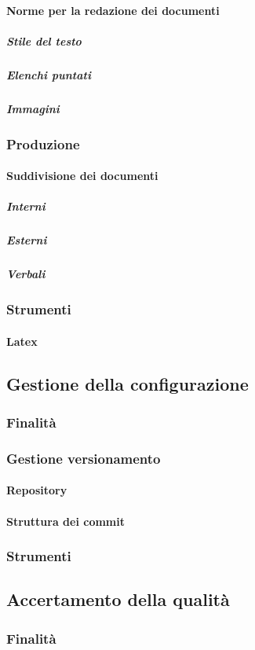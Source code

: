 \documentclass[../norme-di-progetto.tex]{subfiles}
\begin{document}
\paragraph{Norme per la redazione dei documenti}
\subparagraph{Stile del testo}
\subparagraph{Elenchi puntati}
\subparagraph{Immagini}
\subsubsection{Produzione}
\paragraph{Suddivisione dei documenti}
\subparagraph{Interni}
\subparagraph{Esterni}
\subparagraph{Verbali}
\subsubsection{Strumenti}
\paragraph {Latex}
\subsection{Gestione della configurazione}
\subsubsection{Finalità}
\subsubsection{Gestione versionamento}
\paragraph{Repository}
\paragraph{Struttura dei commit}
\subsubsection{Strumenti}
\subsection{Accertamento della qualità}
\subsubsection{Finalità}
\end{document}

